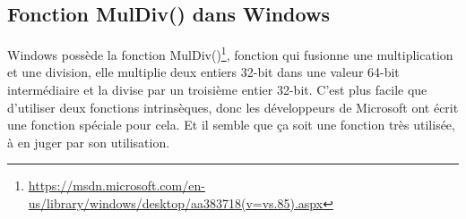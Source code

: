 \subsection{Fonction MulDiv() dans Windows}

Windows possède la fonction MulDiv()\footnote{\url{https://msdn.microsoft.com/en-us/library/windows/desktop/aa383718(v=vs.85).aspx}},
fonction qui fusionne une multiplication et une division, elle multiplie deux entiers
32-bit dans une valeur 64-bit intermédiaire et la divise par un troisième entier 32-bit.
C'est plus facile que d'utiliser deux fonctions intrinsèques, donc les développeurs
de Microsoft ont écrit une fonction spéciale pour cela.
Et il semble que ça soit une fonction très utilisée, à en juger par son utilisation.

